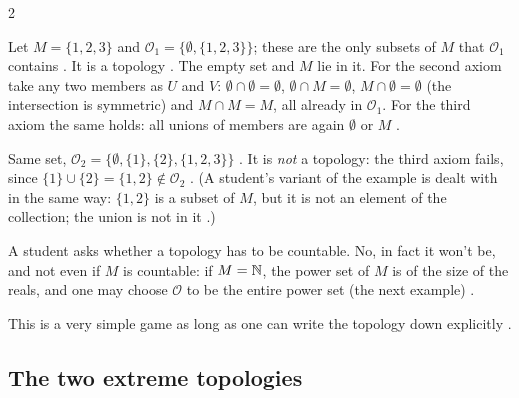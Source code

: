 \begin{paracol}{2}
\begin{example}[A topology on $\{1,2,3\}$]\label{ex:c01-O1}
Let $M=\{1,2,3\}$ and $\mathcal O_1=\{\emptyset,\{1,2,3\}\}$; these are the only subsets of $M$ that $\mathcal O_1$ contains
. It is a topology . The empty set and $M$ lie in it. For the second axiom take
any two members as $U$ and $V$: $\emptyset\cap\emptyset=\emptyset$, $\emptyset\cap M=\emptyset$, $M\cap\emptyset=\emptyset$ (the
intersection is symmetric) and $M\cap M=M$, all already in $\mathcal O_1$. For the third axiom the same holds: all unions of
members are again $\emptyset$ or $M$ .
\end{example}
\begin{example}\label{ex:c01-O2}
Same set, $\mathcal O_2=\{\emptyset,\{1\},\{2\},\{1,2,3\}\}$ . It is \emph{not} a topology: the third axiom fails, since
$\{1\}\cup\{2\}=\{1,2\}\notin\mathcal O_2$ . (A student's variant of the example is dealt with in the same way:
$\{1,2\}$ is a subset of $M$, but it is not an element of the collection; the union is not in it .)
\end{example}

A student asks whether a topology has to be countable. No, in fact it won't be, and not even if $M$ is countable: if
$M=\mathbb{N}$, the power set of $M$ is of the size of the reals, and one may choose $\mathcal O$ to be the entire power set (the next
example) .

This is a very simple game as long as one can write the topology down explicitly .

\subsection{The two extreme topologies}


\end{paracol}
